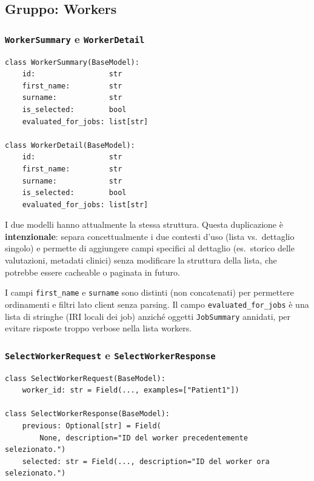 \documentclass[a4paper,12pt]{article}
\begin{document}
\subsection{Gruppo: Workers}

\subsubsection{\texttt{WorkerSummary} e \texttt{WorkerDetail}}

\begin{lstlisting}[caption={\texttt{WorkerSummary} e \texttt{WorkerDetail}.}]
class WorkerSummary(BaseModel):
    id:                 str
    first_name:         str
    surname:            str
    is_selected:        bool
    evaluated_for_jobs: list[str]

class WorkerDetail(BaseModel):
    id:                 str
    first_name:         str
    surname:            str
    is_selected:        bool
    evaluated_for_jobs: list[str]
\end{lstlisting}

\noindent \begin{infobox}
I due modelli hanno attualmente la stessa struttura. Questa duplicazione
\`{e} \textbf{intenzionale}: separa concettualmente i due contesti d'uso
(lista vs.\ dettaglio singolo) e permette di aggiungere campi specifici
al dettaglio (es.\ storico delle valutazioni, metadati clinici) senza
modificare la struttura della lista, che potrebbe essere cacheable o
paginata in futuro.
\end{infobox}

I campi \texttt{first\_name} e \texttt{surname} sono distinti (non
concatenati) per permettere ordinamenti e filtri lato client senza
parsing. Il campo \texttt{evaluated\_for\_jobs} \`{e} una lista di
stringhe (IRI locali dei job) anzich\'{e} oggetti \texttt{JobSummary}
annidati, per evitare risposte troppo verbose nella lista workers.

\subsubsection{\texttt{SelectWorkerRequest} e \texttt{SelectWorkerResponse}}

\begin{lstlisting}[caption={Selezione del lavoratore attivo.}]
class SelectWorkerRequest(BaseModel):
    worker_id: str = Field(..., examples=["Patient1"])

class SelectWorkerResponse(BaseModel):
    previous: Optional[str] = Field(
        None, description="ID del worker precedentemente selezionato.")
    selected: str = Field(..., description="ID del worker ora selezionato.")
\end{lstlisting}
\end{document}
